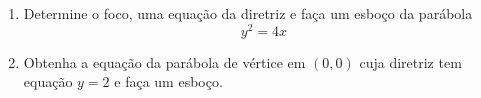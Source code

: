 \begin{frame}[label=conicas]
	\begin{casa}
		
		\begin{enumerate}
			\item Determine o foco, uma equação da diretriz e faça um esboço da parábola
			\[y^2=4x\]
			
			\item Obtenha a equação da parábola de vértice em $(0,0)$ cuja diretriz tem equação $y=2$ e faça um esboço.
		\end{enumerate}
			
	\end{casa}
\end{frame}






